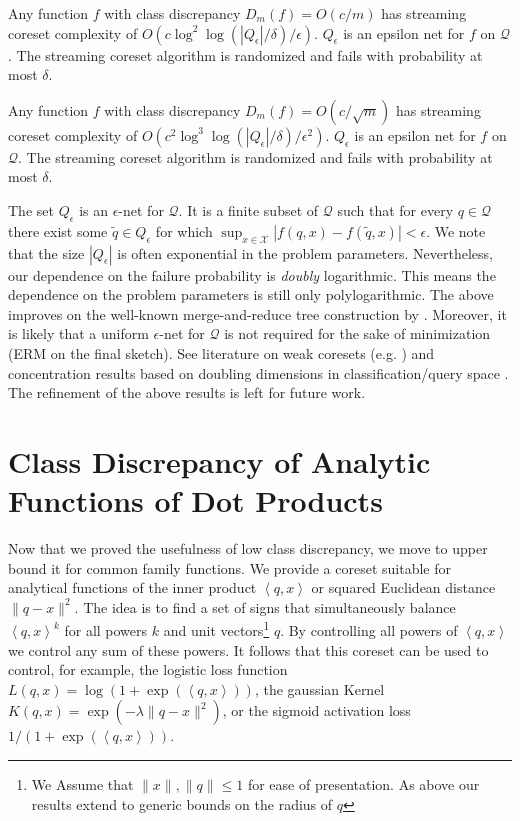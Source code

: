 \documentclass[12pt]{colt2019} %
\newcommand{\ip}[1]{\left \langle #1 \right \rangle}
\newcommand{\eps}{\epsilon}
\newcommand{\X}{\mathcal{X}}
\newcommand{\Q}{\mathcal{Q}}
\begin{document}
\begin{theorem} \label{thm:streaming12}
Any function $f$ with class discrepancy $D_m(f) = O(c/m)$ has streaming coreset complexity of $O\left(c\log^2\log(|Q_\eps|/\delta)/\eps\right)$.
$Q_\eps$ is an epsilon net for $f$ on $\Q$. 
The streaming coreset algorithm is randomized and fails with probability at most $\delta$.
\end{theorem}

\begin{theorem} \label{thm:streaming22}
Any function $f$ with class discrepancy $D_m(f) = O(c/\sqrt{m})$ has streaming coreset complexity of $O\left(c^2\log^3\log(|Q_\eps|/\delta) /\eps^2\right)$.
$Q_\eps$ is an epsilon net for $f$ on $\Q$. 
The streaming coreset algorithm is randomized and fails with probability at most $\delta$.
\end{theorem}

The set $Q_\eps$ is an $\eps$-net for $\Q$. 
It is a finite subset of $\Q$ such that for every $q \in \Q$ there exist some $\tilde{q} \in Q_\eps$ for which $\sup_{x \in \X} |f(q,x) - f(\tilde{q},x)| < \eps$. 
We note that the size $|Q_\eps|$ is often exponential in the problem parameters. 
Nevertheless, our dependence on the failure probability is \emph{doubly} logarithmic. 
This means the dependence on the problem parameters is still only polylogarithmic.
The above improves on the well-known merge-and-reduce tree construction by \cite{BENTLEY1980301}.
Moreover, it is likely that a uniform $\eps$-net for $\Q$ is not required for the sake of minimization (ERM on the final sketch).
See literature on weak coresets (e.g. \cite{Feldman:2007:PKC:1247069.1247072}) and concentration results based on doubling dimensions in classification/query space \cite{BSHOUTY2009323}. The refinement of the above results is left for future work.
 
\section{Class Discrepancy of Analytic Functions of Dot Products} \label{sec:analytic}

Now that we proved the usefulness of low class discrepancy, we move to upper bound it for common family functions. We provide a coreset suitable for analytical functions of the inner product $\ip{q,x}$ or squared Euclidean distance $\|q-x\|^2$. 
%
The idea is to find a set of signs that simultaneously balance $\ip{q,x}^k$ for all powers $k$ and unit vectors\footnote{We Assume that $\|x\|,\|q\| \leq 1$ for ease of presentation. As above our results extend to generic bounds on the radius of $q$} $q$. By controlling all powers of $\ip{q,x}$ we control any sum of these powers. It follows that this coreset can be used to control, for example, the logistic loss function $L(q,x) = \log(1+\exp(\ip{q,x}))$, the gaussian Kernel $K(q,x) = \exp(-\lambda \|q-x\|^2)$, or the sigmoid activation loss $1/(1 + \exp(\ip{q,x}))$.
\end{document}

